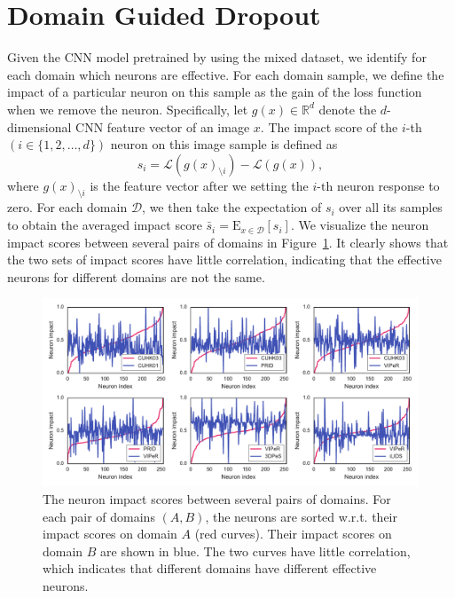 \section{Domain Guided Dropout} %
\label{sec:md-guided-dropout}
Given the CNN model pretrained by using the mixed dataset, we identify for each domain which neurons are effective. For each domain sample, we define the impact of a particular neuron on this sample as the gain of the loss function when we remove the neuron. Specifically, let $g(x)\in \mathbb{R}^d$ denote the $d$-dimensional CNN feature vector of an image $x$. The impact score of the $i$-th $(i\in\{1,2,\dots,d\})$ neuron on this image sample is defined as
\begin{equation} \label{eq:md-true-scores}
   s_i=\mathcal{L}(g(x)_{\setminus i}) - \mathcal{L}(g(x)),
\end{equation}
where $g(x)_{\setminus i}$ is the feature vector after we setting the $i\text{-th}$ neuron response to zero. For each domain $\mathcal{D}$, we then take the expectation of $s_i$ over all its samples to obtain the averaged impact score $\bar{s}_i=\mathrm{E}_{x\in\mathcal{D}}[s_i]$. We visualize the neuron impact scores between several pairs of domains in Figure~\ref{fig:md-impact-between-domains}. It clearly shows that the two sets of impact scores have little correlation, indicating that the effective neurons for different domains are not the same.

\begin{figure}[t]
\begin{center}
\includegraphics[width=1.0\linewidth]{figures/multi_domain/impacts_between_domains.pdf}
\end{center}
\caption{The neuron impact scores between several pairs of domains. For each pair of domains $(A,B)$, the neurons are sorted w.r.t. their impact scores on domain $A$ (red curves). Their impact scores on domain $B$ are shown in blue. The two curves have little correlation, which indicates that different domains have different effective neurons.}
\label{fig:md-impact-between-domains}
\end{figure}

